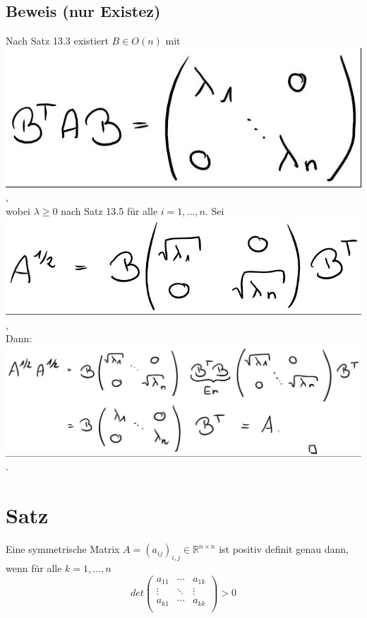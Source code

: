 \documentclass{scrbook}
\begin{document}
\subsection*{Beweis (nur Existez)}
Nach Satz 13.3 existiert $B\in O(n)$ mit\\
\includegraphics{Beweis_13_7_1.jpeg},\\
wobei $\lambda \geq 0$ nach Satz 13.5 für alle $i=1,...,n$.
Sei\\
\includegraphics{Beweis_13_7_2.jpeg},\\
Dann:\\
\includegraphics[width=\textwidth]{Beweis_13_7_3.jpeg}.\\
\section{Satz}
Eine symmetrische Matrix $A=(a_{ij})_{i,j} \in \mathbb{R}^{n \times n}$ ist positiv definit genau dann, wenn für alle $k = 1,...,n$
\[det\left(
\begin{array}{ccc}
a_{11}&\cdots&a_{1k}\\
\vdots&\ddots&\vdots\\
a_{k1}&\cdots&a_{kk}\\
\end{array}
\right) >0\]
\end{document}
